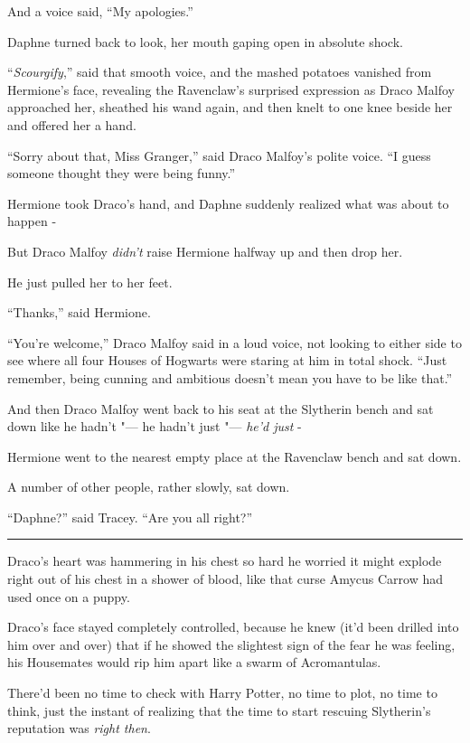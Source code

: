 And a voice said, ``My apologies.''

Daphne turned back to look, her mouth gaping open in absolute shock.

``\emph{Scourgify},'' said that smooth voice, and the mashed potatoes
vanished from Hermione's face, revealing the Ravenclaw's surprised
expression as Draco Malfoy approached her, sheathed his wand again, and
then knelt to one knee beside her and offered her a hand.

``Sorry about that, Miss Granger,'' said Draco Malfoy's polite voice.
``I guess someone thought they were being funny.''

Hermione took Draco's hand, and Daphne suddenly realized what was about
to happen -

But Draco Malfoy \emph{didn't} raise Hermione halfway up and then drop
her.

He just pulled her to her feet.

``Thanks,'' said Hermione.

``You're welcome,'' Draco Malfoy said in a loud voice, not looking to
either side to see where all four Houses of Hogwarts were staring at him
in total shock. ``Just remember, being cunning and ambitious doesn't
mean you have to be like that.''

And then Draco Malfoy went back to his seat at the Slytherin bench and
sat down like he hadn't "--- he hadn't just "--- \emph{he'd just} -

Hermione went to the nearest empty place at the Ravenclaw bench and sat
down.

A number of other people, rather slowly, sat down.

``Daphne?'' said Tracey. ``Are you all right?''

\begin{center}\rule{3in}{0.4pt}\end{center}

Draco's heart was hammering in his chest so hard he worried it might
explode right out of his chest in a shower of blood, like that curse
Amycus Carrow had used once on a puppy.

Draco's face stayed completely controlled, because he knew (it'd been
drilled into him over and over) that if he showed the slightest sign of
the fear he was feeling, his Housemates would rip him apart like a swarm
of Acromantulas.

There'd been no time to check with Harry Potter, no time to plot, no
time to think, just the instant of realizing that the time to start
rescuing Slytherin's reputation was \emph{right then}.

